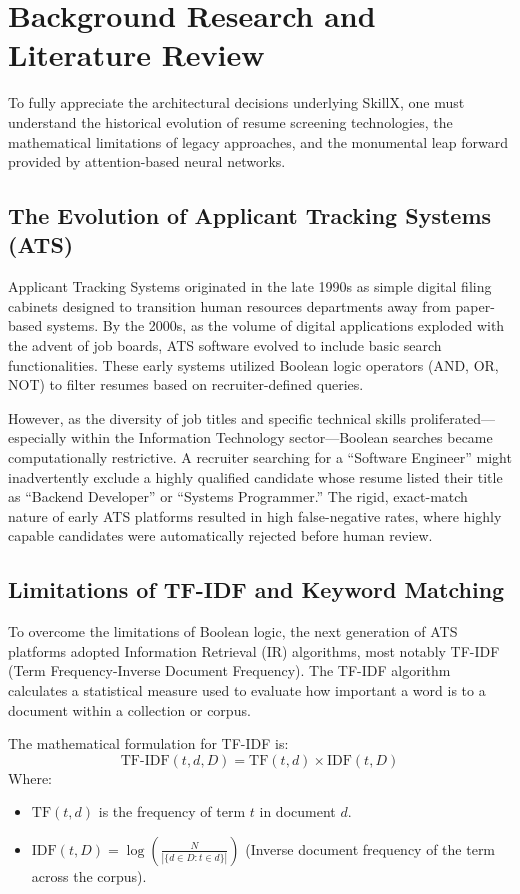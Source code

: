 \documentclass[12pt,a4paper]{report}
\begin{document}
\chapter{Background Research and Literature Review}

To fully appreciate the architectural decisions underlying SkillX, one must understand the historical evolution of resume screening technologies, the mathematical limitations of legacy approaches, and the monumental leap forward provided by attention-based neural networks.

\section{The Evolution of Applicant Tracking Systems (ATS)}

Applicant Tracking Systems originated in the late 1990s as simple digital filing cabinets designed to transition human resources departments away from paper-based systems. By the 2000s, as the volume of digital applications exploded with the advent of job boards, ATS software evolved to include basic search functionalities. These early systems utilized Boolean logic operators (AND, OR, NOT) to filter resumes based on recruiter-defined queries. 

However, as the diversity of job titles and specific technical skills proliferated---especially within the Information Technology sector---Boolean searches became computationally restrictive. A recruiter searching for a ``Software Engineer'' might inadvertently exclude a highly qualified candidate whose resume listed their title as ``Backend Developer'' or ``Systems Programmer.'' The rigid, exact-match nature of early ATS platforms resulted in high false-negative rates, where highly capable candidates were automatically rejected before human review.

\section{Limitations of TF-IDF and Keyword Matching}

To overcome the limitations of Boolean logic, the next generation of ATS platforms adopted Information Retrieval (IR) algorithms, most notably TF-IDF (Term Frequency-Inverse Document Frequency). The TF-IDF algorithm calculates a statistical measure used to evaluate how important a word is to a document within a collection or corpus.

The mathematical formulation for TF-IDF is:
\begin{equation}
\text{TF-IDF}(t, d, D) = \text{TF}(t, d) \times \text{IDF}(t, D)
\end{equation}
Where:
\begin{itemize}
    \item $\text{TF}(t, d)$ is the frequency of term $t$ in document $d$.
    \item $\text{IDF}(t, D) = \log \left( \frac{N}{|\{d \in D : t \in d\}|} \right)$ (Inverse document frequency of the term across the corpus).
\end{itemize}
\end{document}

